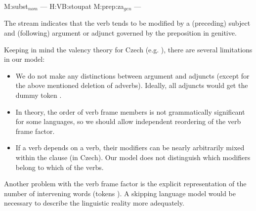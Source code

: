 \documentclass[11pt]{report}
\theoremstyle{plain}
\begin{document}
{{\begin{center}
M:subst$_{nom}$ --- H:VB:stoupat M:prep:za$_{gen}$ ---
\end{center}

The stream indicates that the verb  tends to be modified by a
(preceding) subject and (following) argument or adjunct governed by the
preposition  in genitive.

Keeping in mind the valency theory for Czech (e.g. ),
there are several limitations in our model:

\begin{itemize}

\item We do not make any distinctions between
argument and adjuncts (except for the above mentioned deletion of adverbs).
Ideally, all adjuncts would get the dummy token \text{---}.


\item In theory,
the order of verb frame members is not grammatically significant for some
languages, so we should allow independent reordering of the verb frame factor.


\item If a verb depends on a verb, their modifiers can be nearly arbitrarily mixed
  within the clause (in Czech). Our model does not distinguish which modifiers
  belong to which of the verbs.

\end{itemize}

Another problem with the verb frame factor is the explicit representation of
the number of intervening words (tokens \text{---}). A skipping language model
would be necessary to describe the linguistic reality more adequately.



}}
\end{document}
